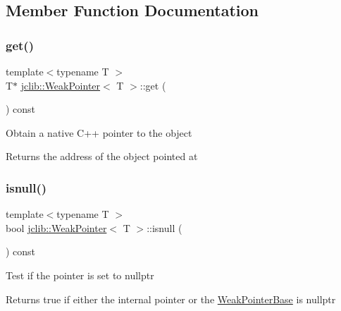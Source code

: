 \subsection{Member Function Documentation}
\mbox{\label{classjclib_1_1WeakPointer_adade4f82b6443201e18991fd0d9d4189}} 
\subsubsection{\texorpdfstring{get()}{get()}}
{\footnotesize\ttfamily template$<$typename T $>$ \\
T$\ast$ \hyperlink{classjclib_1_1WeakPointer}{jclib\+::\+Weak\+Pointer}$<$ T $>$\+::get (\begin{DoxyParamCaption}{ }\end{DoxyParamCaption}) const\hspace{0.3cm}{\ttfamily [inline]}}

Obtain a native C++ pointer to the object \begin{DoxyReturn}{Returns}
the address of the object pointed at 
\end{DoxyReturn}
\mbox{\label{classjclib_1_1WeakPointer_a5cbfbf27685b4591674fa19e1db8dafa}} 
\subsubsection{\texorpdfstring{isnull()}{isnull()}}
{\footnotesize\ttfamily template$<$typename T $>$ \\
bool \hyperlink{classjclib_1_1WeakPointer}{jclib\+::\+Weak\+Pointer}$<$ T $>$\+::isnull (\begin{DoxyParamCaption}{ }\end{DoxyParamCaption}) const\hspace{0.3cm}{\ttfamily [inline]}}

Test if the pointer is set to nullptr \begin{DoxyReturn}{Returns}
true if either the internal pointer or the \hyperlink{classjclib_1_1WeakPointerBase}{Weak\+Pointer\+Base} is nullptr 
\end{DoxyReturn}
\mbox{\label{classjclib_1_1WeakPointer_a14f8326fd06df4bbe22e396b18b1a269}} 

